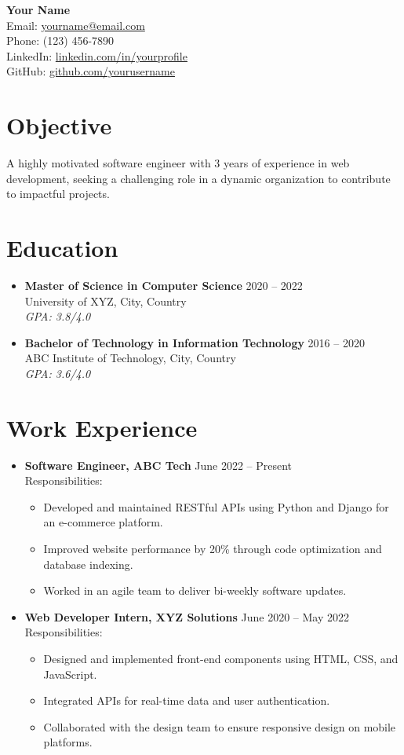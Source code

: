 \documentclass[a4paper,10pt]{article}  %
\newcommand{\ressection}[1]{\section*{\large \textbf{#1}}}
\newcommand{\resitem}[1]{\item \textbf{#1}}
\begin{document}
	
	\begin{center}
		{\Huge \textbf{Your Name}} \\
		Email: \href{mailto:yourname@email.com}{yourname@email.com} \\
		Phone: (123) 456-7890 \\
		LinkedIn: \href{https://www.linkedin.com/in/yourprofile}{linkedin.com/in/yourprofile} \\
		GitHub: \href{https://github.com/yourusername}{github.com/yourusername}
	\end{center}
	
	\ressection{Objective}
	A highly motivated software engineer with 3 years of experience in web development, seeking a challenging role in a dynamic organization to contribute to impactful projects.
	
	\ressection{Education}
	\begin{itemize}[left=0pt]
		\resitem{Master of Science in Computer Science} \hfill 2020 -- 2022 \\
		University of XYZ, City, Country \\
		\textit{GPA: 3.8/4.0}
		
		\resitem{Bachelor of Technology in Information Technology} \hfill 2016 -- 2020 \\
		ABC Institute of Technology, City, Country \\
		\textit{GPA: 3.6/4.0}
	\end{itemize}
	
	\ressection{Work Experience}
	\begin{itemize}[left=0pt]
		\resitem{Software Engineer, ABC Tech} \hfill June 2022 -- Present \\
		Responsibilities:
		\begin{itemize}
			\item Developed and maintained RESTful APIs using Python and Django for an e-commerce platform.
			\item Improved website performance by 20\% through code optimization and database indexing.
			\item Worked in an agile team to deliver bi-weekly software updates.
		\end{itemize}
		
		\resitem{Web Developer Intern, XYZ Solutions} \hfill June 2020 -- May 2022 \\
		Responsibilities:
		\begin{itemize}
			\item Designed and implemented front-end components using HTML, CSS, and JavaScript.
			\item Integrated APIs for real-time data and user authentication.
			\item Collaborated with the design team to ensure responsive design on mobile platforms.
		\end{itemize}
	\end{itemize}
	
\end{document}
